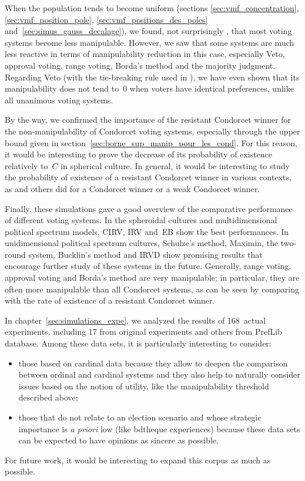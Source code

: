 When the population tends to become uniform (sections \ref{sec:vmf_concentration}, \ref{sec:vmf_position_pole}, \ref{sec:vmf_positions_des_poles} and~\ref{sec:simus_gauss_decalage}), we found, not surprisingly , that most voting systems become less manipulable. However, we saw that some systems are much less reactive in terms of manipulability reduction in this case, especially Veto, approval voting, range voting, Borda's method and the majority judgment. Regarding Veto (with the tie-breaking rule used in \svvamp{}), we have even shown that its manipulability does not tend to~0 when voters have identical preferences, unlike all unanimous voting systems.

By the way, we confirmed the importance of the resistant Condorcet winner for the non-manipulability of Condorcet voting systems, especially through the upper bound given in section~\ref{sec:borne_sup_manip_pour_les_cond}. For this reason, it would be interesting to prove the decrease of its probability of existence relatively to~$ C $ in spherical culture. In general, it would be interesting to study the probability of existence of a resistant Condorcet winner in various contexts, as \cite{gehrlein2006condorcet} and others did for a Condorcet winner or a weak Condorcet winner.

Finally, these simulations gave a good overview of the comparative performance of different voting systems. In the spheroidal cultures and multidimensional political spectrum models, CIRV, IRV and~EB show the best performances. In unidimensional political spectrum cultures, Schulze's method, Maximin, the two-round system, Bucklin's method and IRVD show promising results that encourage further study of these systems in the future. Generally, range voting, approval voting and Borda's method are very manipulable; in particular, they are often more manipulable than all Condorcet systems, as can be seen by comparing with the rate of existence of a resistant Condorcet winner.

\medskip
In chapter~\ref{sec:simulations_expe}, we analyzed the results of 168~actual experiments, including 17 from original experiments and others from PrefLib database. Among these data sets, it is particularly interesting to consider:
\begin{itemize}
\item those based on cardinal data because they allow to deepen the comparison between ordinal and cardinal systems and they also help to naturally consider issues based on the notion of utility, like the manipulability threshold described above;
\item those that do not relate to an election scenario and whose strategic importance is \emph{a priori} low (like bdtheque experiences) because these data sets can be expected to have opinions as sincere as possible.
\end{itemize}
For future work, it would be interesting to expand this corpus as much as possible.
  
